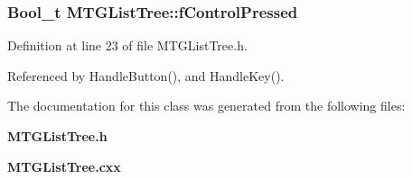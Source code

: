 \subsubsection[{fControlPressed}]{\setlength{\rightskip}{0pt plus 5cm}Bool\_\-t {\bf MTGListTree::fControlPressed}\hspace{0.3cm}{\ttfamily  [private]}}\label{classMTGListTree_a5387e77c9a8fe1512d400294a8e8714f}


Definition at line 23 of file MTGListTree.h.



Referenced by HandleButton(), and HandleKey().



The documentation for this class was generated from the following files:\begin{DoxyCompactItemize}
\item 
{\bf MTGListTree.h}\item 
{\bf MTGListTree.cxx}\end{DoxyCompactItemize}
